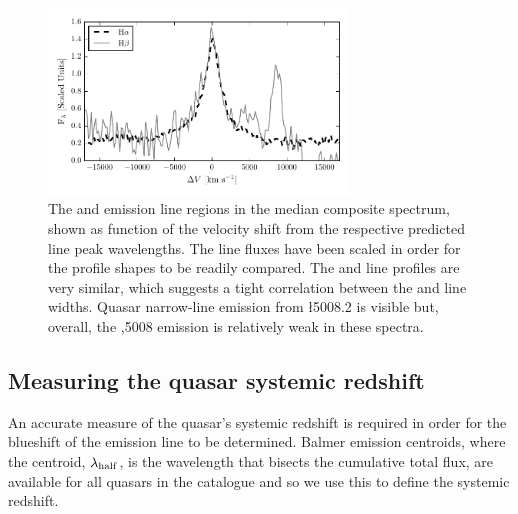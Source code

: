 \begin{figure}
    \includegraphics[width=8cm]{figures/chapter02/ha_hb_composite.pdf} 
    \caption{The \ha and \hb emission line regions in the median composite spectrum, shown as function of the velocity shift from the respective predicted line peak wavelengths. The line fluxes have been scaled in order for the profile shapes to be readily compared. The \ha and \hb line profiles are very similar, which suggests a tight correlation between the \ha and \hb line widths. Quasar narrow-line emission from \l5008.2 is visible but, overall, the ,5008 emission is relatively weak in these spectra.}
    \label{fig:balmer_composite}
\end{figure}


\subsection{Measuring the quasar systemic redshift}

An accurate measure of the quasar's systemic redshift is required in order for the blueshift of the  emission line to be determined.
Balmer emission centroids, where the centroid, $\lambda_{\rm half}$, is the wavelength that bisects the cumulative total flux, are available for all quasars in the catalogue and so we use this to define the systemic redshift.

